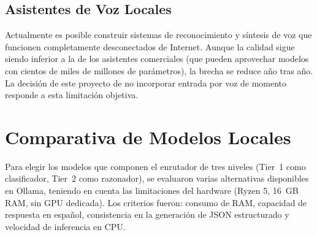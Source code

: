 \subsection{Asistentes de Voz Locales}

Actualmente es posible construir sistemas de reconocimiento y síntesis de voz que funcionen completamente desconectados de Internet. Aunque la calidad sigue siendo inferior a la de los asistentes comerciales (que pueden aprovechar modelos con cientos de miles de millones de parámetros), la brecha se reduce año tras año. La decisión de este proyecto de no incorporar entrada por voz de momento responde a esta limitación objetiva.

\section{Comparativa de Modelos Locales}

Para elegir los modelos que componen el enrutador de tres niveles (Tier~1 como clasificador, Tier~2 como razonador), se evaluaron varias alternativas disponibles en Ollama, teniendo en cuenta las limitaciones del hardware (Ryzen 5, 16~GB RAM, sin GPU dedicada). Los criterios fueron: consumo de RAM, capacidad de respuesta en español, consistencia en la generación de JSON estructurado y velocidad de inferencia en CPU.

